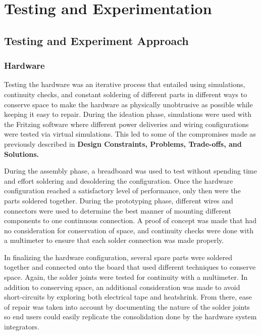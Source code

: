 \section{Testing and Experimentation}\label{sec:testing-and-experimentation}

\subsection{Testing and Experiment Approach}\label{subsec:testing-and-experiment-approach}

\subsubsection{Hardware}

Testing the hardware was an iterative process that entailed using simulations, continuity
checks, and constant soldering of different parts in different ways to conserve space to
make the hardware as physically unobtrusive as possible while keeping it easy to repair.
During the ideation phase, simulations were used with the Fritzing software where
different power deliveries and wiring configurations were tested via virtual
simulations. This led to some of the compromises made as previously described in
\textbf{Design Constraints, Problems, Trade-offs, and Solutions.}

During the assembly phase, a breadboard was used to test without spending time and
effort soldering and desoldering the configuration. Once the hardware configuration reached a
satisfactory level of performance, only then were the parts soldered together. During the
prototyping phase, different wires and connectors were used to determine the best manner of
mounting different components to one continuous connection. A proof of concept was made that
had no consideration for conservation of space, and continuity checks were done with a
multimeter to ensure that each solder connection was made properly.

In finalizing the hardware configuration, several spare parts were soldered together and
connected onto the board that used different techniques to conserve space. Again, the solder
joints were tested for continuity with a multimeter. In addition to conserving space, an
additional consideration was made to avoid short-circuits by exploring both electrical tape
and heatshrink. From there, ease of repair was taken into account by documenting the nature of
the solder joints so end users could easily replicate the consolidation done by the hardware
system integrators.

